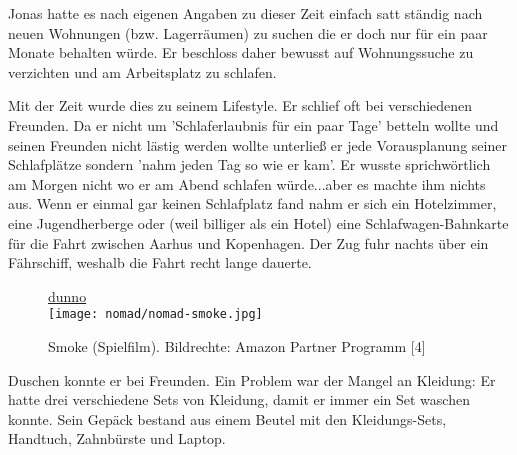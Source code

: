 Jonas hatte es nach eigenen Angaben zu dieser Zeit einfach satt ständig nach neuen Wohnungen (bzw. Lagerräumen) zu suchen die er doch nur für ein paar Monate behalten würde. Er beschloss daher bewusst auf Wohnungssuche zu verzichten und am Arbeitsplatz zu schlafen. 

Mit der Zeit wurde dies zu seinem Lifestyle. Er schlief oft bei verschiedenen Freunden. Da er nicht um 'Schlaferlaubnis für ein paar Tage' betteln wollte und seinen Freunden nicht lästig werden wollte unterließ er jede Vorausplanung seiner Schlafplätze sondern 'nahm jeden Tag so wie er kam'. Er wusste sprichwörtlich am Morgen nicht wo er am Abend schlafen würde...aber es machte ihm nichts aus. Wenn er einmal gar keinen Schlafplatz fand nahm er sich ein Hotelzimmer, eine Jugendherberge oder (weil billiger als ein Hotel) eine Schlafwagen-Bahnkarte für die Fahrt zwischen Aarhus und Kopenhagen. Der Zug fuhr nachts über ein Fährschiff, weshalb die Fahrt recht lange dauerte. 


\begin{figure}
\href{http://goo.gl/9ENgMR}{dunno} \\
\texttt{[image: nomad/nomad-smoke.jpg]}
\caption{Smoke (Spielfilm). Bildrechte: Amazon Partner Programm [4]}
\end{figure}


Duschen konnte er bei Freunden. Ein Problem war der Mangel an Kleidung: Er hatte drei verschiedene Sets von Kleidung, damit er immer ein Set waschen konnte. Sein Gepäck bestand aus einem Beutel mit den Kleidungs-Sets, Handtuch, Zahnbürste und Laptop.

